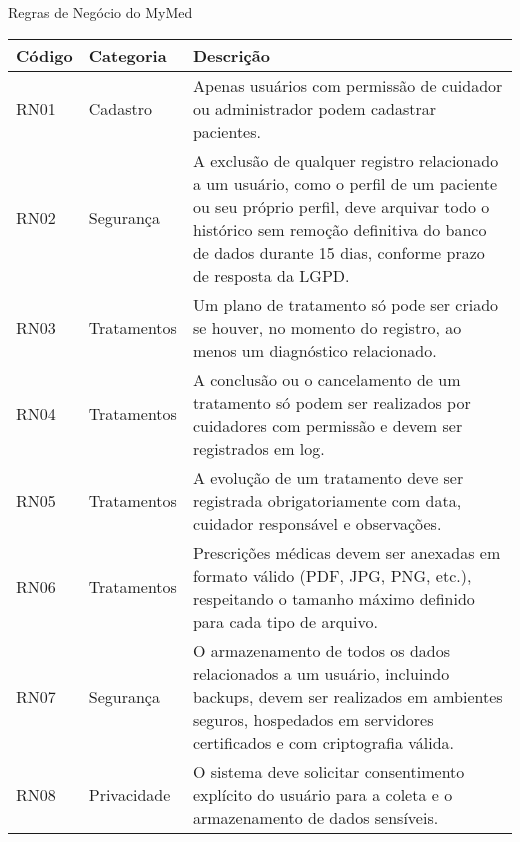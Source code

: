 \begin{quadro}
\caption{Regras de Negócio do MyMed}
\begin{tabularx}{\textwidth}{|l|l|X|}
\hline
\textbf{Código} & \textbf{Categoria} & \textbf{Descrição} \\ \hline
RN01 & Cadastro & Apenas usuários com permissão de cuidador ou administrador podem cadastrar pacientes. \\ \hline
RN02 & Segurança & A exclusão de qualquer registro relacionado a um usuário, como o perfil de um paciente ou seu próprio perfil, deve arquivar todo o histórico sem remoção definitiva do banco de dados durante 15 dias, conforme prazo de resposta da LGPD. \\ \hline
RN03 & Tratamentos & Um plano de tratamento só pode ser criado se houver, no momento do registro, ao menos um diagnóstico relacionado. \\ \hline
RN04 & Tratamentos & A conclusão ou o cancelamento de um tratamento só podem ser realizados por cuidadores com permissão e devem ser registrados em log. \\ \hline
RN05 & Tratamentos & A evolução de um tratamento deve ser registrada obrigatoriamente com data, cuidador responsável e observações. \\ \hline
RN06 & Tratamentos & Prescrições médicas devem ser anexadas em formato válido (PDF, JPG, PNG, etc.), respeitando o tamanho máximo definido para cada tipo de arquivo. \\ \hline
RN07 & Segurança & O armazenamento de todos os dados relacionados a um usuário, incluindo backups, devem ser realizados em ambientes seguros, hospedados em servidores certificados e com criptografia válida. \\ \hline
RN08 & Privacidade & O sistema deve solicitar consentimento explícito do usuário para a coleta e o armazenamento de dados sensíveis. \\ \hline
\end{tabularx}
\end{quadro}